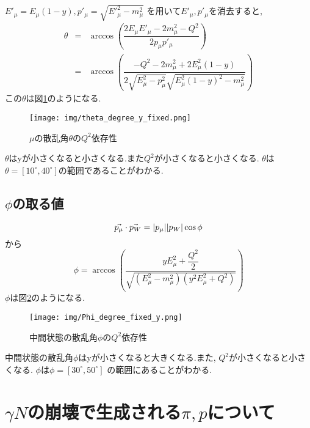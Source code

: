 $E'_\mu = E_\mu(1-y), p'_\mu = \sqrt{E'^2_\mu - m^2_\mu}$
を用いて$E'_\mu, p'_\mu$を消去すると,
\begin{eqnarray}
    \theta & = &\arccos \left( \dfrac {2E_\mu E'_\mu -2m^2_\mu-Q^2}{2p_\mu p'_\mu} \right) \\
    & = & \arccos \left(\dfrac{-Q^2-2m^2_\mu+2E^2_\mu(1-y)}{2\sqrt{E^2_\mu-p^2_\mu}\sqrt{E^2_\mu(1-y)^2-m^2_\mu} }  \right)
\end{eqnarray}
この$\theta$は図\ref{fig:angle3}のようになる.
\begin{figure}[H]
    \centering
    \texttt{[image: img/theta\_degree\_y\_fixed.png]}
    \caption{$\mu$の散乱角$\theta$の$Q^2$依存性}
    \label{fig:angle3}
\end{figure}
$\theta$はyが小さくなると小さくなる.また$Q^2$が小さくなると小さくなる.
$\theta$は$\theta=[10^\circ,40^\circ]$の範囲であることがわかる.

\subsection{$\phi$の取る値}
\begin{equation}
    \vec{p_\mu} \cdot \vec{p_W} = |p_\mu| |p_W| \\ \cos\phi
\end{equation}
から
\begin{equation}
    \phi = \arccos \left( \dfrac{yE^2_\mu + \dfrac{Q^2}{2}} {\sqrt{(E^2_\mu - m^2_\mu)(y^2E^2_\mu+Q^2)}} \right)
\end{equation}
$\phi$は図\ref{fig:angle4}のようになる.
\begin{figure}[H]
    \centering
    \texttt{[image: img/Phi\_degree\_fixed\_y.png]}
    \caption{中間状態の散乱角$\phi$の$Q^2$依存性}
    \label{fig:angle4}
\end{figure}
中間状態の散乱角$\phi$はyが小さくなると大きくなる.また, $Q^2$が小さくなると小さくなる.
$\phi$は$\phi = [30^\circ, 50^\circ]$ の範囲にあることがわかる.

\section{\texorpdfstring{$\gamma N$の崩壊で生成される$\pi, p$について}{LG}}
